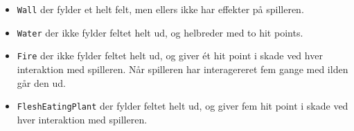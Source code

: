 \begin{itemize}
\item \lstinline{Wall} der fylder et helt felt, men ellers ikke har effekter på
  spilleren.
\item \lstinline{Water} der ikke fylder feltet helt ud, og helbreder med to
  hit points.
\item \lstinline{Fire} der ikke fylder feltet helt ud, og giver ét hit point i
  skade ved hver interaktion med spilleren. Når spilleren har
  interagereret fem gange med ilden går den ud.
\item \lstinline{FleshEatingPlant} der fylder feltet helt ud, og giver fem hit point i
  skade ved hver interaktion med spilleren.
\end{itemize}




